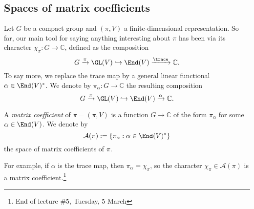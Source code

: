 \documentclass[reqno]{amsart} 
\begin{document}
\subsection{Spaces of matrix coefficients}
Let $G$ be a compact group and $(\pi,V)$ a finite-dimensional representation.  So far, our main tool for saying anything interesting about $\pi$ has been via its character $\chi_\pi : G \rightarrow \mathbb{C}$, defined as the composition
\begin{equation*}
  G \xrightarrow{\pi } \GL(V) \hookrightarrow \End(V)
  \xrightarrow{\trace} \mathbb{C}.
\end{equation*}
To say more, we replace the trace map by a general linear functional $\alpha \in \End(V)^*$.  We denote by $\pi_\alpha : G \rightarrow \mathbb{C}$ the resulting composition
\begin{equation*}
  G \xrightarrow{\pi } \GL(V)
  \hookrightarrow \End(V)
  \xrightarrow{\alpha } \mathbb{C}.
\end{equation*}
\begin{definition}
  A \emph{matrix coefficient} of $\pi = (\pi,V)$ is a function $G \rightarrow \mathbb{C}$ of the form $\pi_\alpha$ for some $\alpha \in \End(V)$.  We denote by
  \begin{equation*}
    \mathcal{A}(\pi) := \{\pi_\alpha : \alpha \in \End(V)^*\}
  \end{equation*}
  the space of matrix coefficients of $\pi$.
\end{definition}
For example, if $\alpha$ is the trace map, then $\pi_\alpha = \chi_\pi$, so the character $\chi_\pi \in \mathcal{A}(\pi)$ is a matrix coefficient.\footnote{End of lecture \#5, Tuesday, 5 March}
\end{document}
